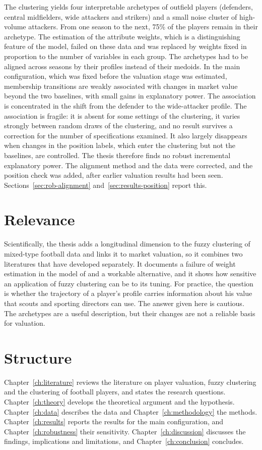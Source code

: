 The clustering yields four interpretable archetypes of outfield players (defenders, central midfielders, wide attackers and strikers) and a small noise cluster of high-volume attackers. From one season to the next, 75\% of the players remain in their archetype. The estimation of the attribute weights, which is a distinguishing feature of the model, failed on these data and was replaced by weights fixed in proportion to the number of variables in each group. The archetypes had to be aligned across seasons by their profiles instead of their medoids. In the main configuration, which was fixed before the valuation stage was estimated, membership transitions are weakly associated with changes in market value beyond the two baselines, with small gains in explanatory power. The association is concentrated in the shift from the defender to the wide-attacker profile. The association is fragile: it is absent for some settings of the clustering, it varies strongly between random draws of the clustering, and no result survives a correction for the number of specifications examined. It also largely disappears when changes in the position labels, which enter the clustering but not the baselines, are controlled. The thesis therefore finds no robust incremental explanatory power. The alignment method and the data were corrected, and the position check was added, after earlier valuation results had been seen. Sections~\ref{sec:rob-alignment} and~\ref{sec:results-position} report this.

\section{Relevance}

Scientifically, the thesis adds a longitudinal dimension to the fuzzy clustering of mixed-type football data and links it to market valuation, so it combines two literatures that have developed separately. It documents a failure of weight estimation in the model of  and a workable alternative, and it shows how sensitive an application of fuzzy clustering can be to its tuning. For practice, the question is whether the trajectory of a player's profile carries information about his value that scouts and sporting directors can use. The answer given here is cautious. The archetypes are a useful description, but their changes are not a reliable basis for valuation.

\section{Structure}

Chapter~\ref{ch:literature} reviews the literature on player valuation, fuzzy clustering and the clustering of football players, and states the research questions. Chapter~\ref{ch:theory} develops the theoretical argument and the hypothesis. Chapter~\ref{ch:data} describes the data and Chapter~\ref{ch:methodology} the methods. Chapter~\ref{ch:results} reports the results for the main configuration, and Chapter~\ref{ch:robustness} their sensitivity. Chapter~\ref{ch:discussion} discusses the findings, implications and limitations, and Chapter~\ref{ch:conclusion} concludes.
